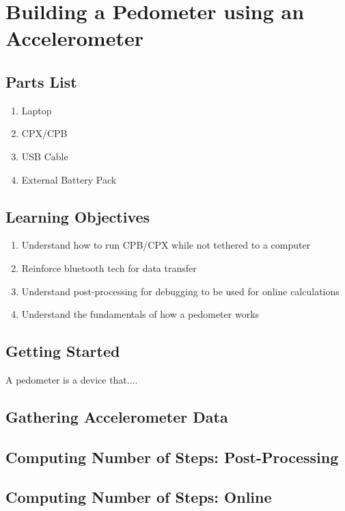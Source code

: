 \newpage

\section{Building a Pedometer using an Accelerometer}
\label{s:pendulum}

\subsection{Parts List}

\begin{enumerate}[itemsep=-5pt]
\item Laptop
\item CPX/CPB
\item USB Cable
\item External Battery Pack
\end{enumerate}

\subsection{Learning Objectives}
\begin{enumerate}[itemsep=-5pt]
\item Understand how to run CPB/CPX while not tethered to a computer
\item Reinforce bluetooth tech for data transfer
\item Understand post-processing for debugging to be used for online calculations
\item Understand the fundamentals of how a pedometer works
\end{enumerate}

\subsection{Getting Started}

A pedometer is a device that....

\subsection{Gathering Accelerometer Data}

\subsection{Computing Number of Steps: Post-Processing}

\subsection{Computing Number of Steps: Online}

